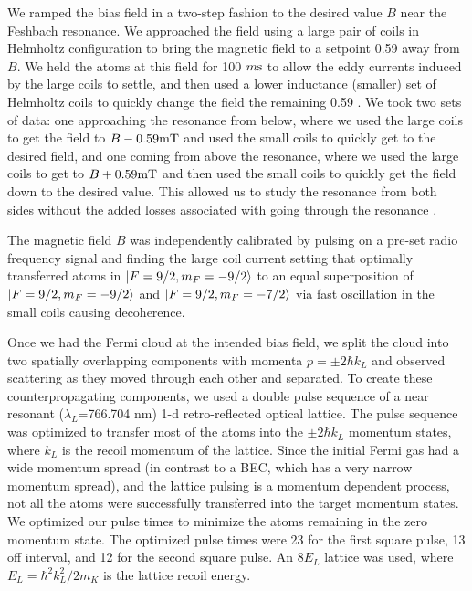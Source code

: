 \documentclass[12pt]{iopart}
\begin{document}
\par We ramped the bias field in a two-step fashion to the desired value $B$ near the Feshbach resonance. We approached the field using a large pair of  coils in Helmholtz configuration to bring the magnetic field to a setpoint 0.59 \mT{} away from $B$. We held the atoms at this field for 100 $m\rm{s}$ to allow the eddy currents induced by the large coils to settle, and then used a lower inductance (smaller) set of Helmholtz coils to quickly change the field the remaining 0.59 \mT{}. We took two sets of data: one approaching the resonance from below, where we used the large coils to get the field to $B-0.59 \mT{}$ and used the small coils to quickly get to the desired field, and one coming from above the resonance, where we used the large coils to get to $B+0.59  \mT{}$ and then used the small coils to quickly get the field down to the desired value. This allowed us to study the resonance from both sides without the added losses associated with going through the resonance \cite{Chin10}.
\par The magnetic field $B$ was independently calibrated by pulsing on a pre-set radio frequency signal and finding the large coil current setting that optimally transferred \K{} atoms in $\mathinner{|{F=9/2,m_F=-9/2}\rangle}$ to an equal superposition of $\mathinner{|{F=9/2,m_F=-9/2}\rangle}$ and $\mathinner{|{F=9/2,m_F=-7/2}\rangle}$ via fast oscillation in the small coils causing decoherence.
\par Once we had the Fermi cloud at the intended bias field, we split the cloud into two spatially overlapping components with momenta $p=\pm 2\hbar k_L$  and observed scattering as they moved through each other and separated. To create these counterpropagating components, we used a double pulse sequence \cite{Wu05} of a near resonant ($\lambda_L$=766.704 nm) 1-d retro-reflected optical lattice. The pulse sequence was optimized to transfer most of the atoms into the $\pm 2 \hbar k_L$ momentum states, where $k_L$ is the recoil momentum of the lattice. Since the initial Fermi gas had a wide momentum spread (in contrast to a BEC, which has a very narrow momentum spread), and the lattice pulsing is a momentum dependent process, not all the atoms were successfully transferred into the target momentum states. We optimized our pulse times to minimize the atoms remaining in the zero momentum state. The optimized pulse times were 23 \us{} for the first square pulse, 13 \us{} off interval, and 12 \us{} for the second square pulse. An 8$E_L$ lattice was used, where $E_L=\hbar^2 k_L^2/2m_K$ is the lattice recoil energy.  
\end{document}
